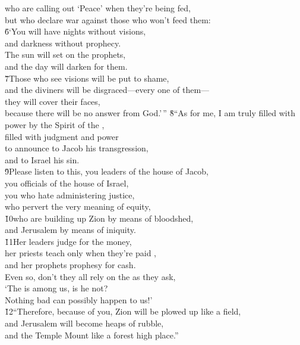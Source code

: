 \begin{poetry}
\poeml who are calling out `Peace' when they're being fed, \\
\poemll    but who declare war against those who won't feed them: \\
\poeml \v{6}`You will have nights without visions, \\
\poemll    and darkness without prophecy. \\
\poeml The sun will set on the prophets, \\
\poemll    and the day will darken for them. \\
\poeml \v{7}Those who see visions will be put to shame, \\
\poemll    and the diviners will be disgraced---every one of them--- \\
\poeml they will cover their faces, \\
\poemll    because there will be no answer from God.'\,''
\poeml \v{8}``As for me, I am truly filled with power by the Spirit of the , \\
\poemll    filled with judgment and power \\
\poeml to announce to Jacob his transgression, \\
\poemll    and to Israel his sin. \\
\poeml \v{9}Please listen to this, you leaders of the house of Jacob, \\
\poemll    you officials of the house of Israel, \\
\poeml you who hate administering justice, \\
\poemll    who pervert the very meaning of equity, \\
\poeml \v{10}who are building up Zion by means of bloodshed, \\
\poemll    and Jerusalem by means of iniquity. \\
\poeml \v{11}Her leaders judge for the money, \\
\poemll    her priests teach only when they're paid , \\
\poemlll       and her prophets prophesy for cash. \\
\poeml Even so, don't they all rely on the  as they ask, \\
\poemll    `The  is among us, is he not? \\
\poemlll       Nothing bad can possibly happen to us!' \\
\poeml \v{12}``Therefore, because of you, Zion will be plowed up like a field, \\
\poemll    and Jerusalem will become heaps of rubble, \\
\poemlll       and the Temple Mount like a forest high place.''
\end{poetry}

